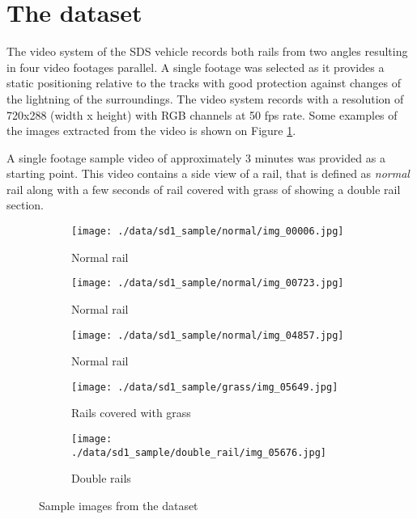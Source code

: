 \section{The dataset} \label{dataset}
The video system of the SDS vehicle records both rails from two angles resulting in four video footages
parallel.
A single footage was selected as it provides a static positioning relative to the tracks with good
protection against changes of the lightning of the surroundings.
The video system records with a resolution of 720x288 (width x height) with RGB channels
at 50 fps rate.
Some examples of the images extracted from the video is shown on Figure \ref{fig:example_images}.

A single footage sample video of approximately 3 minutes was provided as a starting point.
This video contains a side view of a rail, that is defined as \emph{normal} rail
along with a few seconds of rail covered with grass of showing a double rail section.

\begin{figure}[!ht]
    \centering
    \begin{subfigure}{0.3\textwidth}
        \centering
        \texttt{[image: ./data/sd1\_sample/normal/img\_00006.jpg]}
        \caption*{Normal rail}
    \end{subfigure}
    \begin{subfigure}{0.3\textwidth}
        \centering
        \texttt{[image: ./data/sd1\_sample/normal/img\_00723.jpg]}
        \caption*{Normal rail}
    \end{subfigure}
    \begin{subfigure}{0.3\textwidth}
        \centering
        \texttt{[image: ./data/sd1\_sample/normal/img\_04857.jpg]}
        \caption*{Normal rail}
    \end{subfigure}
    \begin{subfigure}{0.3\textwidth}
        \centering
        \texttt{[image: ./data/sd1\_sample/grass/img\_05649.jpg]}
        \caption*{Rails covered with grass}
    \end{subfigure}
    \begin{subfigure}{0.3\textwidth}
        \centering
        \texttt{[image: ./data/sd1\_sample/double\_rail/img\_05676.jpg]}
        \caption*{Double rails}
    \end{subfigure}
    \caption{Sample images from the dataset}
    \label{fig:example_images}
\end{figure}

